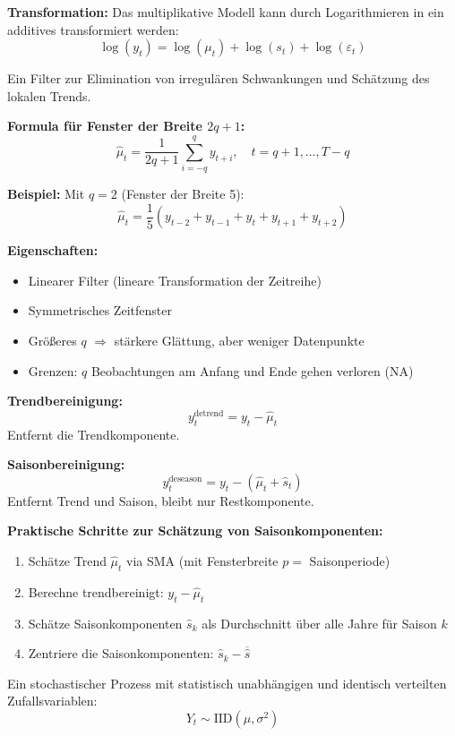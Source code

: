 \textbf{Transformation:} Das multiplikative Modell kann durch Logarithmieren in ein additives transformiert werden:
$$\log(y_t) = \log(\mu_t) + \log(s_t) + \log(\varepsilon_t)$$

Ein Filter zur Elimination von irregulären Schwankungen und Schätzung des lokalen Trends.

\textbf{Formula für Fenster der Breite $2q+1$:}
$$\hat{\mu}_t = \frac{1}{2q+1} \sum_{i=-q}^{q} y_{t+i}, \quad t = q+1, \ldots, T-q$$

\textbf{Beispiel:} Mit $q = 2$ (Fenster der Breite 5):
$$\hat{\mu}_t = \frac{1}{5}(y_{t-2} + y_{t-1} + y_t + y_{t+1} + y_{t+2})$$

\textbf{Eigenschaften:}
\begin{itemize}[leftmargin=1.5em]
    \item Linearer Filter (lineare Transformation der Zeitreihe)
    \item Symmetrisches Zeitfenster
    \item Größeres $q$ $\Rightarrow$ stärkere Glättung, aber weniger Datenpunkte
    \item Grenzen: $q$ Beobachtungen am Anfang und Ende gehen verloren (NA)
\end{itemize}


\textbf{Trendbereinigung:}
$$y_t^{\text{detrend}} = y_t - \hat{\mu}_t$$
Entfernt die Trendkomponente.

\textbf{Saisonbereinigung:}
$$y_t^{\text{deseason}} = y_t - (\hat{\mu}_t + \hat{s}_t)$$
Entfernt Trend und Saison, bleibt nur Restkomponente.

\textbf{Praktische Schritte zur Schätzung von Saisonkomponenten:}
\begin{enumerate}[leftmargin=1.5em]
    \item Schätze Trend $\hat{\mu}_t$ via SMA (mit Fensterbreite $p = $ Saisonperiode)
    \item Berechne trendbereinigt: $y_t - \hat{\mu}_t$
    \item Schätze Saisonkomponenten $\hat{s}_k$ als Durchschnitt über alle Jahre für Saison $k$
    \item Zentriere die Saisonkomponenten: $\hat{s}_k - \overline{\hat{s}}$
\end{enumerate}

Ein stochastischer Prozess mit statistisch unabhängigen und identisch verteilten Zufallsvariablen:
$$Y_t \sim \text{IID}(\mu, \sigma^2)$$

